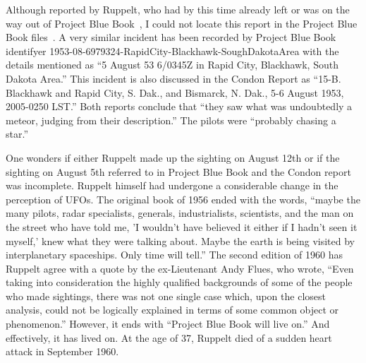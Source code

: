 Although reported by Ruppelt, who had by this time already left or was on the way out of Project Blue Book~\cite{Ruppelt2011May},
I could not locate this report in the Project Blue Book files~\cite{bluebook-directory-listing}.
A very similar incident has been recorded by Project Blue Book identifyer 1953-08-6979324-RapidCity-Blackhawk-SoughDakotaArea
with the details mentioned as ``5 August 53 6/0345Z in Rapid City, Blackhawk, South Dakota Area.''
This incident is also discussed in the Condon Report as
``15-B. Blackhawk and Rapid City, S. Dak., and Bismarck, N. Dak., 5-6 August 1953, 2005-0250 LST.''
Both reports conclude that ``they saw what was undoubtedly a meteor, judging from their description.'' The pilots were ``probably chasing a star.''

One wonders if either Ruppelt made up the sighting on August 12th or if the sighting on August 5th referred to in Project Blue Book and the Condon report was incomplete. Ruppelt himself had undergone a considerable change in the perception of UFOs. The original book of 1956 ended with the words, ``maybe the many pilots, radar specialists, generals, industrialists, scientists, and the man on the street who have told me, 'I wouldn't have believed it either if I hadn't seen it myself,' knew what they were talking about. Maybe the earth is being visited by interplanetary spaceships. Only time will tell.'' The second edition of 1960 has Ruppelt agree with a quote by the ex-Lieutenant Andy Flues, who wrote, ``Even taking into consideration the highly qualified backgrounds of some of the people who made sightings, there was not one single case which, upon the closest analysis, could not be logically explained in terms of some common object or phenomenon.''
However, it ends with ``Project Blue Book will live on.'' And effectively, it has lived on.
At the age of 37, Ruppelt died of a  sudden  heart attack in September 1960.

